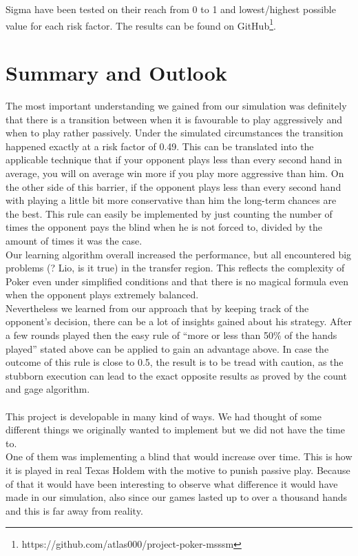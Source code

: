 \documentclass[11pt]{article}
\begin{document}
Sigma have been tested on their reach from 0 to 1 and lowest/highest possible value for each risk factor. The results can be found on GitHub\footnote{https://github.com/atlas000/project-poker-msssm}.



\section{Summary and Outlook}

The most important understanding we gained from our simulation was definitely that there is a transition between when it is favourable to play aggressively and when to play rather passively. Under the simulated circumstances the transition happened exactly at a risk factor of 0.49. This can be translated into the applicable technique that if your opponent plays less than every second hand in average, you will on average win more if you play more aggressive than him. On the other side of this barrier, if the opponent plays less than every second hand with playing a little bit more conservative than him the long-term chances are the best. This rule can easily be implemented by just counting the number of times the opponent pays the blind when he is not forced to, divided by the amount of times it was the case.\\

Our learning algorithm overall increased the performance, but all encountered big problems (? Lio, is it true) in the transfer region. This reflects the complexity of Poker even under simplified conditions and that there is no magical formula even when the opponent plays extremely balanced.\\

Nevertheless we learned from our approach that by keeping track of the opponent’s decision, there can be a lot of insights gained about his strategy. After a few rounds played then the easy rule of “more or less than 50\% of the hands played” stated above can be applied to gain an advantage above. In case the outcome of this rule is close to 0.5, the result is to be tread with caution, as the stubborn execution can lead to the exact opposite results as proved by the count and gage algorithm.\\ \\

This project is developable in many kind of ways. We had thought of some different things we originally wanted to implement but we did not have the time to. \\
One of them was implementing a blind that would increase over time. This is how it is played in real Texas Holdem with the motive to punish passive play. Because of that it would have been interesting to observe what difference it would have made in our simulation, also since our games lasted up to over a thousand hands and this is far away from reality.\\
\end{document}
